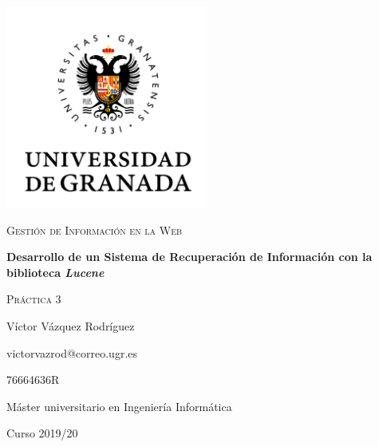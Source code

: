 \documentclass{article}
\begin{document}
\begin{titlepage}
  \centering
  \includegraphics[width=0.5\textwidth]{images/logo-ugr.png}\par
  \vspace{1cm}
  {\Large\scshape Gestión de Información en la Web \par}
  {\huge\bfseries Desarrollo de un Sistema de Recuperación de Información con la
  biblioteca \textit{Lucene} \par}
  \vspace{0.2cm}
  {\scshape Práctica 3 \par}
  \vfill
  {\large Víctor Vázquez Rodríguez  \par}
  {victorvazrod@correo.ugr.es \par}
  {76664636R}
  \vfill
  {\large Máster universitario en Ingeniería Informática \par}
  \vspace{0.2cm}
  {Curso 2019/20 \par}
\end{titlepage}

\tableofcontents\newpage

\newpage
\newpage
\newpage
\newpage
\end{document}
